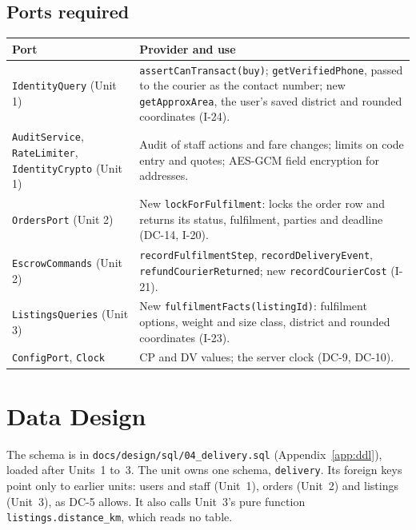 \documentclass[11pt,a4paper]{article}
\newenvironment{dtable}[1]{\small\begin{longtable}{#1}}{\end{longtable}}
\begin{document}
\subsection{Ports required}
\begin{dtable}{@{}>{\raggedright\arraybackslash}p{4.4cm}>{\raggedright\arraybackslash}p{10.8cm}@{}}
\toprule
\textbf{Port} & \textbf{Provider and use} \\ \midrule \endhead
\texttt{IdentityQuery} (Unit 1) & \texttt{assertCanTransact(buy)}; \texttt{getVerifiedPhone}, passed to the courier as the contact number; new \texttt{getApproxArea}, the user's saved district and rounded coordinates (I-24). \\
\texttt{AuditService}, \texttt{RateLimiter}, \texttt{IdentityCrypto} (Unit 1) & Audit of staff actions and fare changes; limits on code entry and quotes; AES-GCM field encryption for addresses. \\
\texttt{OrdersPort} (Unit 2) & New \texttt{lockForFulfilment}: locks the order row and returns its status, fulfilment, parties and deadline (DC-14, I-20). \\
\texttt{EscrowCommands} (Unit 2) & \texttt{recordFulfilmentStep}, \texttt{recordDeliveryEvent}, \texttt{refundCourierReturned}; new \texttt{recordCourierCost} (I-21). \\
\texttt{ListingsQueries} (Unit 3) & New \texttt{fulfilmentFacts(listingId)}: fulfilment options, weight and size class, district and rounded coordinates (I-23). \\
\texttt{ConfigPort}, \texttt{Clock} & CP and DV values; the server clock (DC-9, DC-10). \\
\bottomrule
\end{dtable}
\section{Data Design}
\label{sec:data}
The schema is in \texttt{docs/design/sql/04\_delivery.sql} (Appendix~\ref{app:ddl}), loaded after Units~1 to~3. The unit owns one schema, \texttt{delivery}. Its foreign keys point only to earlier units: users and staff (Unit~1), orders (Unit~2) and listings (Unit~3), as DC-5 allows. It also calls Unit~3's pure function \texttt{listings.distance\_km}, which reads no table.
\end{document}
